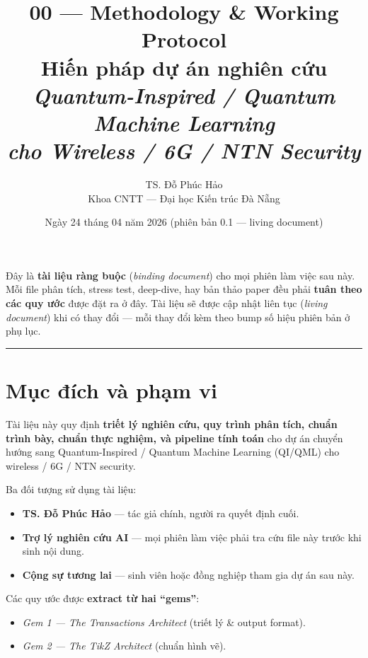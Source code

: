 \documentclass[11pt,a4paper]{article}
\title{\vspace{-1.5cm}\textbf{\color{accent} 00 --- Methodology \& Working Protocol} \\[3pt]
       \Large Hiến pháp dự án nghiên cứu \\[2pt]
       \normalsize \textit{Quantum-Inspired / Quantum Machine Learning} \\[2pt]
       \normalsize \textit{cho Wireless / 6G / NTN Security}}
\author{TS. Đỗ Phúc Hảo \\ \small Khoa CNTT --- Đại học Kiến trúc Đà Nẵng}
\date{Ngày 24 tháng 04 năm 2026 (phiên bản 0.1 --- living document)}
\begin{document}
\maketitle
\thispagestyle{fancy}

\begin{note}
Đây là \textbf{tài liệu ràng buộc} (\textit{binding document}) cho mọi phiên làm việc sau này. Mỗi file phân tích, stress test, deep-dive, hay bản thảo paper đều phải \textbf{tuân theo các quy ước} được đặt ra ở đây. Tài liệu sẽ được cập nhật liên tục (\textit{living document}) khi có thay đổi --- mỗi thay đổi kèm theo bump số hiệu phiên bản ở phụ lục.
\end{note}

\tableofcontents
\vspace{0.4cm}
\hrule
\vspace{0.4cm}

\section{Mục đích và phạm vi}

Tài liệu này quy định \textbf{triết lý nghiên cứu, quy trình phân tích, chuẩn trình bày, chuẩn thực nghiệm, và pipeline tính toán} cho dự án chuyển hướng sang Quantum-Inspired / Quantum Machine Learning (QI/QML) cho wireless / 6G / NTN security.

Ba đối tượng sử dụng tài liệu:
\begin{itemize}
  \item \textbf{TS. Đỗ Phúc Hảo} --- tác giả chính, người ra quyết định cuối.
  \item \textbf{Trợ lý nghiên cứu AI} --- mọi phiên làm việc phải tra cứu file này trước khi sinh nội dung.
  \item \textbf{Cộng sự tương lai} --- sinh viên hoặc đồng nghiệp tham gia dự án sau này.
\end{itemize}

Các quy ước được \textbf{extract từ hai ``gems''}:
\begin{itemize}
  \item \textit{Gem 1 --- The Transactions Architect} (triết lý \& output format).
  \item \textit{Gem 2 --- The TikZ Architect} (chuẩn hình vẽ).
\end{itemize}

\end{document}
